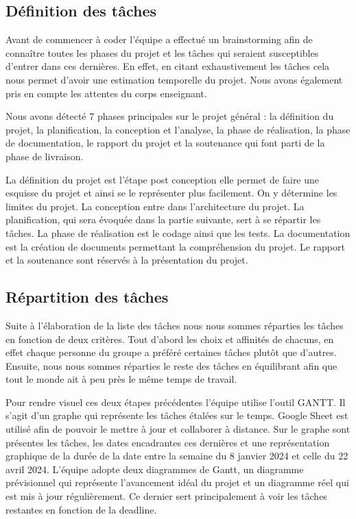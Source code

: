 \documentclass[a4paper,12pt]{article}
\begin{document}
\subsection{Définition des tâches}
Avant de commencer à coder l’équipe a effectué un brainstorming afin de connaître toutes les phases du projet et les tâches qui seraient susceptibles d’entrer dans ces dernières. 
En effet, en citant exhaustivement les tâches cela nous permet d’avoir une estimation temporelle du projet. 
Nous avons également pris en compte les attentes du corps enseignant.

Nous avons détecté 7 phases principales sur le projet général : la définition du projet, la planification, la conception et l'analyse, la phase de réalisation, la phase de documentation, le rapport du projet et la soutenance qui font parti de la phase de livraison.

La définition du projet est l’étape post conception elle permet de faire une esquisse du projet et ainsi se le représenter plus facilement. 
On y détermine les limites du projet. 
La conception entre dans l’architecture du projet. 
La planification, qui sera évoquée dans la partie suivante, sert à se répartir les tâches. La phase de réalisation est le codage ainsi que les tests. 
La documentation est la création de documents permettant la compréhension du projet. 
Le rapport et la soutenance sont réservés à la présentation du projet.

\subsection{Répartition des tâches}
Suite à l’élaboration de la liste des tâches nous nous sommes réparties les tâches en fonction de deux critères. 
Tout d’abord les choix et affinités de chacuns, en effet chaque personne du groupe a préféré certaines tâches plutôt que d’autres. 
Ensuite, nous nous sommes réparties le reste des tâches en équilibrant afin que tout le monde ait à peu près le même temps de travail.

Pour rendre visuel ces deux étapes précédentes l’équipe utilise l'outil GANTT. 
Il s’agit d’un graphe qui représente les tâches étalées sur le temps. 
Google Sheet est utilisé afin de pouvoir le mettre à jour et collaborer à distance.
Sur le graphe sont présentes les tâches, les dates encadrantes ces dernières et une représentation graphique de la durée de la date entre la semaine du 8 janvier 2024 et celle du 22 avril 2024.
L’équipe adopte deux diagrammes de Gantt, un diagramme prévisionnel qui représente l’avancement idéal du projet et un diagramme réel qui est mis à jour régulièrement. 
Ce dernier sert principalement à voir les tâches restantes en fonction de la deadline.
\end{document}
